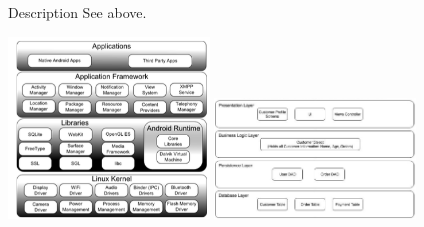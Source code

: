\begin{nfps}
\item[Description] See above.
\end{nfps}

\begin{center}
    \includegraphics[width=0.4\textwidth]{./layered}
    \includegraphics[width=0.4\textwidth]{./layered2}
\end{center}

